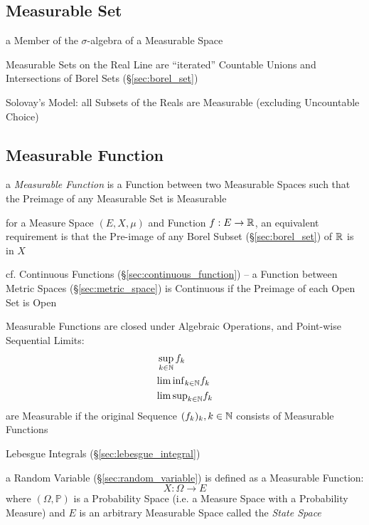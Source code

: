 \subsection{Measurable Set}\label{sec:measurable_set}

a Member of the $\sigma$-algebra of a Measurable Space

Measurable Sets on the Real Line are ``iterated'' Countable Unions and
Intersections of Borel Sets (\S\ref{sec:borel_set})

Solovay's Model: all Subsets of the Reals are Measurable (excluding Uncountable
Choice)



\subsection{Measurable Function}\label{sec:measurable_function}

a \emph{Measurable Function} is a Function between two Measurable Spaces such
that the Preimage of any Measurable Set is Measurable

for a Measure Space $(E, X, \mu)$ and Function $f : E \rightarrow \mathbb{R}$, an
equivalent requirement is that the Pre-image of any Borel Subset
(\S\ref{sec:borel_set}) of $\mathbb{R}$ is in $X$

\fist cf. Continuous Functions (\S\ref{sec:continuous_function}) -- a Function
between Metric Spaces (\S\ref{sec:metric_space}) is Continuous if the Preimage
of each Open Set is Open

Measurable Functions are closed under Algebraic Operations, and Point-wise
Sequential Limits:
\begin{align*}
  & \sup_{k\in\mathbb{N}} f_k \\
  & {\lim \inf}_{k\in\mathbb{N}} f_k \\
  & {\lim \sup}_{k\in\mathbb{N}} f_k \\
\end{align*}
are Measurable if the original Sequence $(f_k)_k, k \in \mathbb{N}$ consists of
Measurable Functions

\fist Lebesgue Integrals (\S\ref{sec:lebesgue_integral})

a Random Variable (\S\ref{sec:random_variable}) is defined as a Measurable
Function:
\[
  X : \Omega \rightarrow E
\]
where $(\Omega,\mathbb{P})$ is a Probability Space (i.e. a Measure Space with a
Probability Measure) and $E$ is an arbitrary Measurable Space called the
\emph{State Space}

